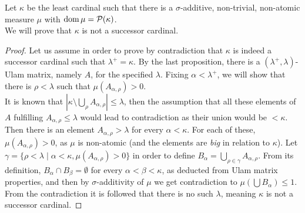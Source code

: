 \subquestion{}
Let $\kappa$ be the least cardinal such that there is a $\sigma$-additive, non-trivial, non-atomic measure $\mu$ with $\operatorname{dom} \mu = \mathcal{P}(\kappa)$. \\
We will prove that $\kappa$ is not a successor cardinal.
\begin{proof}
	Let us assume in order to prove by contradiction that $\kappa$ is indeed a successor cardinal such that $\lambda^+ = \kappa$.
	By the last proposition, there is a $(\lambda^+, \lambda)$-Ulam matrix, namely $A$, for the specified $\lambda$.
	Fixing $\alpha < \lambda^+$, we will show that there is $\rho < \lambda$ such that $\mu(A_{\alpha, \rho}) > 0$. \\
	It is known that $|\kappa \setminus \bigcup_\rho A_{\alpha, \rho}| \le \lambda$,
	then the assumption that all these elements of $A$ fulfilling $A_{\alpha, \rho} \le \lambda$ would lead to contradiction as their union would be $< \kappa$.
	Then there is an element $A_{\alpha, \rho} > \lambda$ for every $\alpha < \kappa$. For each of these, $\mu(A_{\alpha, \rho}) > 0$, as $\mu$ is non-atomic (and the elements are \textit{big} in relation to $\kappa$).
	Let $\gamma = \{ \rho < \lambda \mid \alpha < \kappa, \mu(A_{\alpha, \rho}) > 0 \}$ in order to define $B_\alpha = \bigcup_{\rho \in \gamma} A_{\alpha, \rho}$.
	From its definition, $B_\alpha \cap B_\beta = \emptyset$ for every $\alpha < \beta < \kappa$, as deducted from Ulam matrix properties,
	and then by $\sigma$-additivity of $\mu$ we get contradiction to $\mu(\bigcup B_\alpha) \le 1$.
	From the contradiction it is followed that there is no such $\lambda$, meaning $\kappa$ is not a successor cardinal.
\end{proof}

